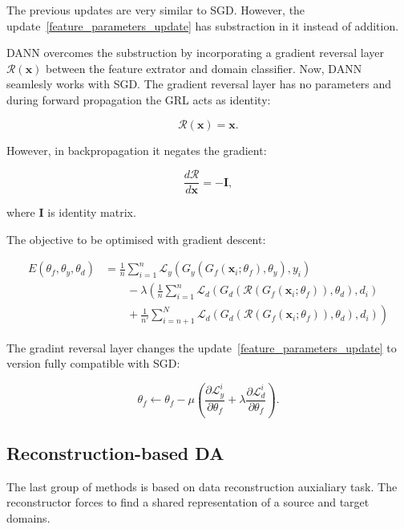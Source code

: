 The previous updates are very similar to SGD.
However, the update~\ref{feature_parameters_update} has substraction in it instead of addition.

DANN overcomes the substruction by incorporating a gradient reversal layer \(\mathcal{R}(\mathbf{x})\) between the feature extrator and domain classifier.
Now, DANN seamlesly works with SGD.
The gradient reversal layer has no parameters
and during forward propagation the GRL acts as identity:

\begin{equation}
	\mathcal{R}(\mathbf{x}) = \mathbf{x}.
\end{equation}

However, in backpropagation it negates the gradient:

\begin{equation}
	\frac{d \mathcal{R}}{d \mathbf{x}} = -\mathbf{I},
\end{equation}

where \(\mathbf{I}\) is identity matrix.

The objective to be optimised with gradient descent:

\begin{align}
	E(\theta_f, \theta_y, \theta_d) &= \frac{1}{n} \sum^{n}_{i = 1} \mathcal{L}_y(G_y(G_f(\mathbf{x}_i; \theta_f), \theta_y), y_i) \nonumber \\
	&\qquad {} - \lambda \left(\frac{1}{n} \sum^{n}_{i = 1} \mathcal{L}_d(G_d(\mathcal{R}(G_f(\mathbf{x}_i; \theta_f)), \theta_d), d_i) \right. \nonumber \\
	&\qquad \left. {} + \frac{1}{n'} \sum^{N}_{i = n + 1} \mathcal{L}_d(G_d(\mathcal{R}(G_f(\mathbf{x}_i; \theta_f)), \theta_d), d_i)\right)
\end{align}

The gradint reversal layer changes the update~\ref{feature_parameters_update}
to version fully compatible with SGD:

\begin{equation}
	\theta_f \gets \theta_f - \mu \left(
	\frac{\partial \mathcal{L}_y^i}{\partial \theta_f}
	+ \lambda \frac{\partial \mathcal{L}_d^i}{\partial \theta_f}
	\right).
\end{equation}

\subsection{Reconstruction-based DA}

The last group of methods is based on data reconstruction auxialiary task.
The reconstructor forces to find a shared representation
of a source and target domains.

